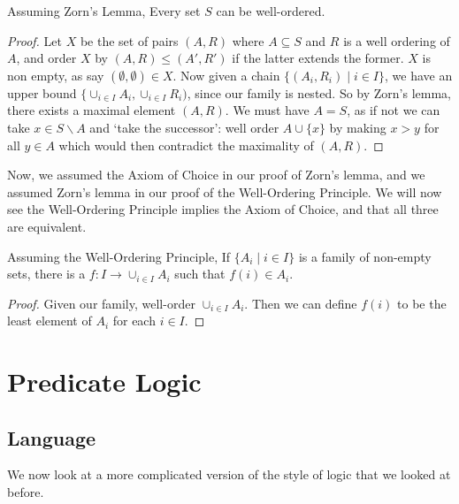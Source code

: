 \documentclass[a4paper, 10pt, twocolumn]{amsart}
\begin{document}
\begin{theorem}
  Assuming Zorn's Lemma, Every set $S$ can be well-ordered.
\end{theorem}
\begin{proof}
  Let $X$ be the set of pairs $(A, R)$ where $A \subseteq S$ and $R$ is a well ordering of $A$, and order $X$ by $(A, R) \leq (A', R')$ if the latter extends the former. $X$ is non empty, as say $(\emptyset, \emptyset) \in X$. Now given a chain $\{(A_i, R_i) \mid i \in I\}$, we have an upper bound $\{\cup_{i \in I} A_i, \cup_{i \in I} R_i)$, since our family is nested.
So by Zorn's lemma, there exists a maximal element $(A, R)$. We must have $A = S$, as if not we can take $x \in S \backslash A$ and `take the successor': well order $A \cup \{x\}$ by making $x > y$ for all $y \in A$ which would then contradict the maximality of $(A, R)$.
\end{proof}

Now, we assumed the Axiom of Choice in our proof of Zorn's lemma, and we assumed Zorn's lemma in our proof of the Well-Ordering Principle. We will now see the Well-Ordering Principle implies the Axiom of Choice, and that all three are equivalent.

\begin{theorem}
  Assuming the Well-Ordering Principle, 
  If $\{A_i \mid i \in I\}$ is a family of non-empty sets, there is a  $f: I \rightarrow \cup_{i \in I} A_i$ such that $f(i) \in A_i$.
\end{theorem}
\begin{proof}
  Given our family, well-order $\cup_{i \in I} A_i$. Then we can define $f(i)$ to be the least element of $A_i$ for each $i \in I$.
\end{proof}


\section{Predicate Logic}

\subsection{Language}

We now look at a more complicated version of the style of logic that we looked at before.
\end{document}
